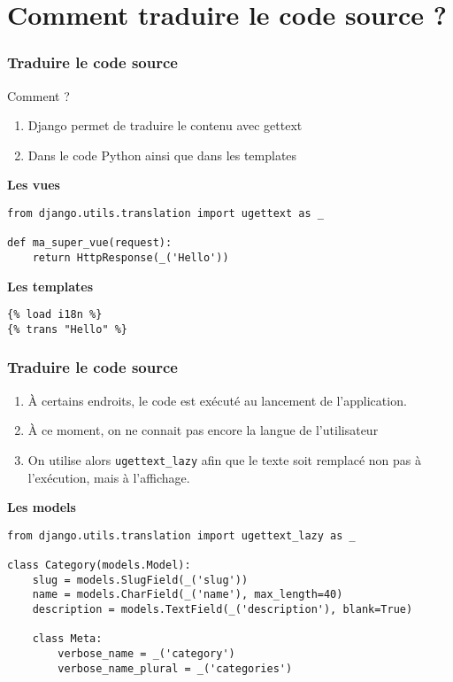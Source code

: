 \documentclass{beamer}
\begin{document}
\section{Comment traduire le code source ?}

\begin{frame}[fragile]
  \frametitle{Traduire le code source}
    \begin{alertblock}{Comment ?}
    \begin{enumerate}
      \pause \item Django permet de traduire le contenu avec gettext
      \pause \item Dans le code Python ainsi que dans les templates
    \end{enumerate}
    \end{alertblock}
    \pause
    \textbf{Les vues}
  \begin{lstlisting}
from django.utils.translation import ugettext as _

def ma_super_vue(request):
    return HttpResponse(_('Hello'))
  \end{lstlisting}
  \pause
  \textbf{Les templates}
  \begin{lstlisting}
{% load i18n %}
{% trans "Hello" %}
  \end{lstlisting}

\end{frame}


\begin{frame}[fragile]
  \frametitle{Traduire le code source}

\begin{enumerate}
  \item À certains endroits, le code est exécuté au lancement de l'application.
  \pause \item À ce moment, on ne connait pas encore la langue de l'utilisateur
  \pause \item On utilise alors \texttt{ugettext\_lazy} afin que le texte soit remplacé non pas à l'exécution, mais à l'affichage.
\end{enumerate}
\pause
  \textbf{Les models}
  \begin{lstlisting}
from django.utils.translation import ugettext_lazy as _

class Category(models.Model):
    slug = models.SlugField(_('slug'))
    name = models.CharField(_('name'), max_length=40)
    description = models.TextField(_('description'), blank=True)

    class Meta:
        verbose_name = _('category')
        verbose_name_plural = _('categories')
  \end{lstlisting}

\end{frame}
\end{document}
